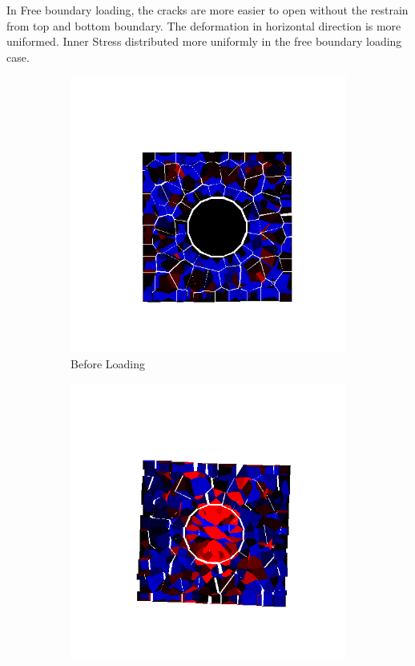 In Free boundary loading, the cracks are more easier to open without the restrain from top and bottom boundary. The deformation in horizontal direction is more uniformed. Inner Stress distributed more uniformly in the free boundary loading case.

\begin{figure}[ht!]
\centering

    \begin{subfigure}{.33\textwidth}
      \centering
      \includegraphics[width=1.0\linewidth]{Files/Small_DEF/IS2/DEP5-STEP(020).png}
      \caption{Before Loading}
    \end{subfigure}%
    \begin{subfigure}{.33\textwidth}
      \centering
      \includegraphics[width=1.0\linewidth]{Files/Small_DEF/Free_IS2/DEP5-STEP(040).png}

\end{subfigure}
\end{figure}
